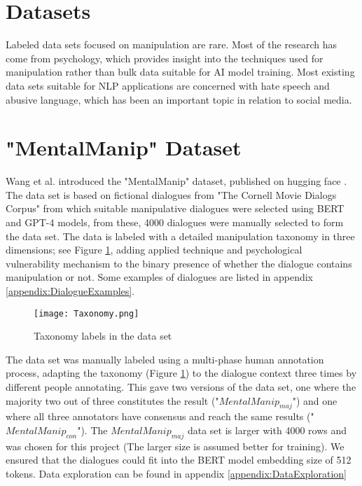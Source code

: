 \documentclass[
	letterpaper, %
	12pt, %
	unnumberedsections, %
	twoside, %
]{LTJournalArticle}
\begin{document}
\section{Datasets}
Labeled data sets focused on manipulation are rare. Most of the research has come from psychology, which provides insight into the techniques used for manipulation rather than bulk data suitable for AI model training. Most existing data sets suitable for NLP applications are concerned with hate speech and abusive language, which has been an important topic in relation to social media.

\section{"MentalManip" Dataset}
Wang et al. \cite{MentalManip} introduced the "MentalManip" dataset, published on hugging face \cite{MentalManipDataset}. The data set is based on fictional dialogues from "The Cornell Movie Dialogs Corpus" \cite{CornellMovieCorpus} from which suitable manipulative dialogues were selected using BERT and GPT-4 models, from these, 4000 dialogues were manually selected to form the data set. The data is labeled with a detailed manipulation taxonomy in three dimensions; see Figure \ref{fig:Taxonomy}, adding applied technique and psychological vulnerability mechanism to the binary presence of whether the dialogue contains manipulation or not. Some examples of dialogues are listed in appendix \ref{appendix:DialogueExamples}.

\begin{figure}[!htp] %
	\centering
	\texttt{[image: Taxonomy.png]}
	\caption{Taxonomy labels in the data set}
	\label{fig:Taxonomy}
\end{figure}

The data set was manually labeled using a multi-phase human annotation process, adapting the taxonomy (Figure \ref{fig:Taxonomy}) to the dialogue context three times by different people annotating. This gave two versions of the data set, one where the majority two out of three constitutes the result ("$MentalManip_{maj}$") and one where all three annotators have consensus and reach the same results ("$MentalManip_{con}$"). The $MentalManip_{maj}$ data set is larger with 4000 rows and was chosen for this project (The larger size is assumed better for training). We ensured that the dialogues could fit into the BERT model embedding size of 512 tokens.
Data exploration can be found in appendix \ref{appendix:DataExploration}
\end{document}
